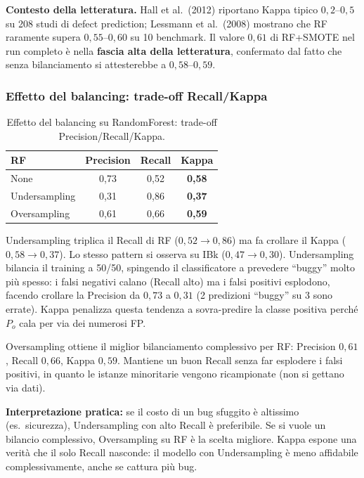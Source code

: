 \textbf{Contesto della letteratura.} Hall et al.\ (2012) riportano Kappa tipico
$0{,}2$--$0{,}5$ su 208 studi di defect prediction; Lessmann et al.\ (2008) mostrano che
RF raramente supera $0{,}55$--$0{,}60$ su 10 benchmark. Il valore $0{,}61$ di RF+SMOTE
nel run completo è nella \textbf{fascia alta della letteratura}, confermato dal fatto che
senza bilanciamento si attesterebbe a $0{,}58$--$0{,}59$.

\subsubsection{Effetto del balancing: trade-off Recall/Kappa}

\begin{table}[h!]
\centering
\small
\begin{tabular}{@{}lccc@{}}
\toprule
\textbf{RF} & \textbf{Precision} & \textbf{Recall} & \textbf{Kappa} \\
\midrule
None          & 0,73 & 0,52 & \textbf{0,58} \\
Undersampling & 0,31 & 0,86 & \textbf{0,37} \\
Oversampling  & 0,61 & 0,66 & \textbf{0,59} \\
\bottomrule
\end{tabular}
\caption{Effetto del balancing su RandomForest: trade-off Precision/Recall/Kappa.}
\end{table}

Undersampling triplica il Recall di RF ($0{,}52 \to 0{,}86$) ma fa crollare il Kappa
($0{,}58 \to 0{,}37$). Lo stesso pattern si osserva su IBk ($0{,}47 \to 0{,}30$).
Undersampling bilancia il training a 50/50, spingendo il classificatore a prevedere
``buggy'' molto più spesso: i falsi negativi calano (Recall alto) ma i falsi positivi
esplodono, facendo crollare la Precision da $0{,}73$ a $0{,}31$ (2 predizioni ``buggy''
su 3 sono errate). Kappa penalizza questa tendenza a sovra-predire la classe positiva
perché $P_o$ cala per via dei numerosi FP.

Oversampling ottiene il miglior bilanciamento complessivo per RF: Precision $0{,}61$,
Recall $0{,}66$, Kappa $0{,}59$. Mantiene un buon Recall senza far esplodere i falsi
positivi, in quanto le istanze minoritarie vengono ricampionate (non si gettano via dati).

\textbf{Interpretazione pratica:} se il costo di un bug sfuggito è altissimo (es.\
sicurezza), Undersampling con alto Recall è preferibile. Se si vuole un bilancio
complessivo, Oversampling su RF è la scelta migliore. Kappa espone una verità che il solo
Recall nasconde: il modello con Undersampling è meno affidabile complessivamente, anche
se cattura più bug.


